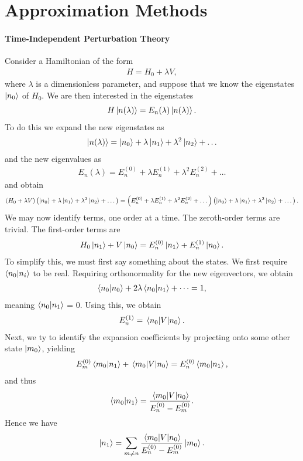 \section{Approximation Methods}

\paragraph{Time-Independent Perturbation Theory}
Consider a Hamiltonian of the form
\begin{align*}
	H = H_{0} + \lambda V,
\end{align*}
where $\lambda$ is a dimensionless parameter, and suppose that we know the eigenstates $\ket{n_{0}}$ of $H_{0}$. We are then interested in the eigenstates
\begin{align*}
	H\ket{n(\lambda)} = E_{n}(\lambda)\ket{n(\lambda)}.
\end{align*}
To do this we expand the new eigenstates as
\begin{align*}
	\ket{n(\lambda)} = \ket{n_{0}} + \lambda\ket{n_{1}} + \lambda^{2}\ket{n_{2}} + \dots
\end{align*}
and the new eigenvalues as
\begin{align*}
	E_{n}(\lambda) = E_{n}^{(0)} + \lambda E_{n}^{(1)} + \lambda^{2}E_{n}^{(2)} + \dots
\end{align*}
and obtain
\begin{align*}
	(H_{0} + \lambda V)\left(\ket{n_{0}} + \lambda\ket{n_{1}} + \lambda^{2}\ket{n_{2}} + \dots\right) = \left(E_{n}^{(0)} + \lambda E_{n}^{(1)} + \lambda^{2}E_{n}^{(2)} + \dots\right)\left(\ket{n_{0}} + \lambda\ket{n_{1}} + \lambda^{2}\ket{n_{2}} + \dots\right).
\end{align*}
We may now identify terms, one order at a time. The zeroth-order terms are trivial. The first-order terms are
\begin{align*}
	H_{0}\ket{n_{1}} + V\ket{n_{0}} = E_{n}^{(0)}\ket{n_{1}} + E_{n}^{(1)}\ket{n_{0}}.
\end{align*}
To simplify this, we must first say something about the states. We first require $\braket{n_{0}}{n_{i}}$ to be real. Requiring orthonormality for the new eigenvectors, we obtain
\begin{align*}
	\braket{n_{0}} + 2\lambda\braket{n_{0}}{n_{1}} + \dots = 1,
\end{align*}
meaning $\braket{n_{0}}{n_{1}}$ = 0. Using this, we obtain
\begin{align*}
	E_{n}^{(1)} = \expval{V}{n_{0}}.
\end{align*}
Next, we ty to identify the expansion coefficients by projecting onto some other state $\ket{m_{0}}$, yielding
\begin{align*}
	E_{m}^{(0)}\braket{m_{0}}{n_{1}} + \mel{m_{0}}{V}{n_{0}} = E_{n}^{(0)}\braket{m_{0}}{n_{1}},
\end{align*}
and thus
\begin{align*}
	\braket{m_{0}}{n_{1}} = \frac{\mel{m_{0}}{V}{n_{0}}}{E_{n}^{(0)} - E_{m}^{(0)}}.
\end{align*}
Hence we have
\begin{align*}
	\ket{n_{1}} = \sum\limits_{m\neq n}\frac{\mel{m_{0}}{V}{n_{0}}}{E_{n}^{(0)} - E_{m}^{(0)}}\ket{m_{0}}.
\end{align*}

